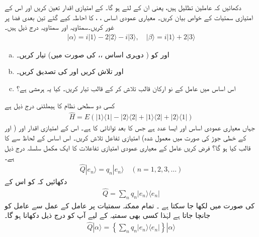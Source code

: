  
دکھائیں کہ عاملین تظلیل  ہیں، یعنی ان کے لئے ہو گا۔  کے امتیازی اقدار تعین کریں اور اس کے امتیازی سمتیات کے خواص بیان کریں۔
 معیاری عمودی اساس ،  ،  کا احاطہ کیے گئے تین بعدی فضا پر غور کریں۔سمتاویہ  اور  سمتاویہ  درج ذیل ہیں۔ 
\begin{align*}
| \alpha \rangle = i | 1 \rangle -2|2\rangle -i|3\rangle , \quad | \beta \rangle = i|1\rangle +2|3\rangle 
\end{align*}
\begin{enumerate}[a.]
\item
  اور  کو ( دوہری اساس  ،،  کی صورت میں) تیار کریں۔ 
\item
  اور  تلاش کریں اور  کی تصدیق کریں۔
\item
 اس اساس میں عامل  کے نو ارکان قالب تلاش کر کے قالب  تیار کریں۔ کیا یہ ہرمشی ہے؟
\end{enumerate} 
کسی دو سطحی نظام کا ہیملٹنی درج ذیل ہے 
\begin{align*}
\hat{H} = E( | 1 \rangle \langle 1 | - |2\rangle \langle 2 | + | 1 \rangle \langle 2 | + | 2 \rangle \langle 1 | )
\end{align*}
جہاں  معیاری عمودی اساس اور  ایسا عدد ہے جس کا بعد توانائی کا ہے۔ اس کے امتیازی اقدار اور (  اور  کے خطی جوڑ کی صورت میں معمول شدہ) امتیازی تفاعل تلاش کریں۔ اس اساس کے لحاظ سے  کا قالب  کیا ہو گا؟ 
 فرض کریں عامل  کے معیاری عمودی امتیازی تفاعلات کا ایک مکمل سلسلہ درج ذیل ہے۔ 
\begin{align*}
\hat{Q}|e_{n} \rangle = q_{n} | e_{n} \rangle \quad (n = 1,2,3,\dotsc )
\end{align*}
دکھائیں کہ  کو اس کے
\begin{align*}
\hat{Q} = \sum_{n} q_{n} | e_{n} \rangle \langle e_{n} |
\end{align*}
 کی صورت میں لکھا جا سکتا ہے ۔  \quad 
 تمام ممکنہ سمتیات پر عامل کے عمل سے عامل کو جانچا جاتا ہے لہٰذا کسی بھی سمتیہ  کے لیے آپ کو درج ذیل دکھانا ہو گا۔ 
\begin{align*}
\hat{Q} | \alpha \rangle = \left\{ \sum_{n} q_{n} | e_{n} \rangle \langle e_{n} | \right\} | \alpha \rangle 
\end{align*}


